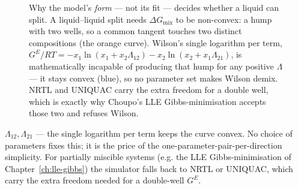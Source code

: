 \documentclass[11pt,a4paper]{article}
\newcommand{\Gex}{G^{E}}
\begin{document}
\begin{figure}[ht]\centering
{}
\caption{Why the model's \emph{form} --- not its fit --- decides whether
a liquid can split.  A liquid--liquid split needs $\Delta G_{\mathrm{mix}}$
to be non-convex: a hump with two wells, so a common tangent touches two
distinct compositions (the orange curve).  Wilson's single logarithm per
term, $\Gex/RT=-x_1\ln(x_1+x_2\Lambda_{12})-x_2\ln(x_2+x_1\Lambda_{21})$,
is mathematically incapable of producing that hump for any positive
$\Lambda$ --- it stays convex (blue), so no parameter set makes Wilson
demix.  NRTL and UNIQUAC carry the extra freedom for a double well, which
is exactly why Choupo's LLE Gibbs-minimisation accepts those two and
refuses Wilson.}
\label{fig:wilson-vs-nrtl-wells}
\end{figure}

$\Lambda_{12},\Lambda_{21}$ --- the single logarithm per term keeps the
curve convex. No choice of parameters fixes this; it is the price of the
one-parameter-pair-per-direction simplicity. For partially miscible
systems (e.g. the LLE Gibbs-minimisation of Chapter~\ref{ch:lle-gibbs}) the simulator
falls back to NRTL or UNIQUAC, which carry the extra freedom needed for a
double-well $\Gex$.
\end{document}
